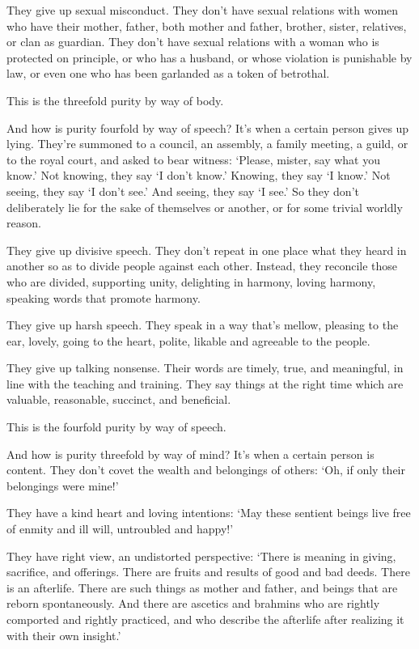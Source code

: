 \documentclass[12pt,openany]{book}%
\begin{document}
They give up sexual misconduct. They don’t have sexual relations with women who have their mother, father, both mother and father, brother, sister, relatives, or clan as guardian. They don’t have sexual relations with a woman who is protected on principle, or who has a husband, or whose violation is punishable by law, or even one who has been garlanded as a token of betrothal. 

This is the threefold purity by way of body. 

And how is purity fourfold by way of speech? It’s when a certain person gives up lying. They’re summoned to a council, an assembly, a family meeting, a guild, or to the royal court, and asked to bear witness: ‘Please, mister, say what you know.’ Not knowing, they say ‘I don’t know.’ Knowing, they say ‘I know.’ Not seeing, they say ‘I don’t see.’ And seeing, they say ‘I see.’ So they don’t deliberately lie for the sake of themselves or another, or for some trivial worldly reason. 

They give up divisive speech. They don’t repeat in one place what they heard in another so as to divide people against each other. Instead, they reconcile those who are divided, supporting unity, delighting in harmony, loving harmony, speaking words that promote harmony. 

They give up harsh speech. They speak in a way that’s mellow, pleasing to the ear, lovely, going to the heart, polite, likable and agreeable to the people. 

They give up talking nonsense. Their words are timely, true, and meaningful, in line with the teaching and training. They say things at the right time which are valuable, reasonable, succinct, and beneficial. 

This is the fourfold purity by way of speech. 

And how is purity threefold by way of mind? It’s when a certain person is content. They don’t covet the wealth and belongings of others: ‘Oh, if only their belongings were mine!’ 

They have a kind heart and loving intentions: ‘May these sentient beings live free of enmity and ill will, untroubled and happy!’ 

They have right view, an undistorted perspective: ‘There is meaning in giving, sacrifice, and offerings. There are fruits and results of good and bad deeds. There is an afterlife. There are such things as mother and father, and beings that are reborn spontaneously. And there are ascetics and brahmins who are rightly comported and rightly practiced, and who describe the afterlife after realizing it with their own insight.’ 
\end{document}
